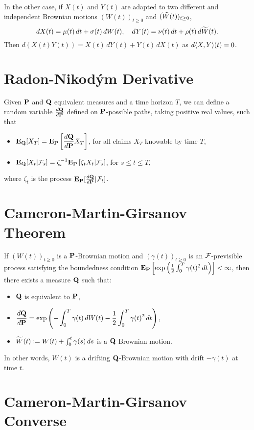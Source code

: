 \documentclass[twocolumn]{amsart}
\begin{document}
In the other case, if $X(t)$ and $Y(t)$ are adapted to two different and independent Brownian motions $(W(t))_{t \ge 0} $ and $(\tW(t))_{t \ge 0}$,
\[
    dX(t) =  \mu(t)\,dt + \sigma(t) \,dW(t), \quad
    dY(t) =  \nu(t)\,dt + \rho(t)\,d\tW(t).
\]
Then $d(X(t) Y(t)) = X(t) \,dY(t) + Y(t)\,dX(t)$ as $d\QV{X,Y}(t) = 0$.

\section*{Radon-Nikod\'ym Derivative}

Given $\P$ and $\Q$ equivalent measures and a time horizon $T$, we can define a random variable $\frac{d\Q}{d\P}$ defined on $\P$-possible paths, taking positive real values, such that
\begin{itemize}
    \item $\displaystyle \EQ[X_T] = \EP\left[\frac{d\Q}{d\P} X_T \right]$, for all claims $X_T$ knowable by time $T$,
    \item $\displaystyle \EQ[X_t | \F_s] = \zeta_s^{-1} \EP\left[\zeta_t X_t|\F_s\right]$, for $s \le t \le T$,
\end{itemize}
where $\zeta_t$ is the process $\EP[\frac{d \Q}{d \P} | \F_t]$.

\section*{Cameron-Martin-Girsanov Theorem}

If $(W(t))_{t \ge 0}$ is a $\P$-Brownian motion and $(\gamma(t))_{t \ge 0}$ is an $\F$-previsible process satisfying the boundedness condition $\EP\left[\exp\left(\frac{1}{2} \int_0^T\gamma(t)^2\,dt\right)\right] < \infty$, then there exists a measure $\Q$ such that:
\begin{itemize}
    \item $\Q$ is equivalent to $\P$,
    \item $\displaystyle \frac{d \Q}{d \P} = \exp\left(- \int_0^T \gamma(t)\,dW(t) - \frac{1}{2} \int_0^T \gamma(t)^2\,dt \right)$,
    \item $\tW(t) := W(t) + \int_0^t \gamma(s)\,ds$ is a $\Q$-Brownian motion.
\end{itemize}
In other words, $W(t)$ is a drifting $\Q$-Brownian motion with drift $-\gamma(t)$ at time $t$.

\section*{Cameron-Martin-Girsanov Converse}
\end{document}
